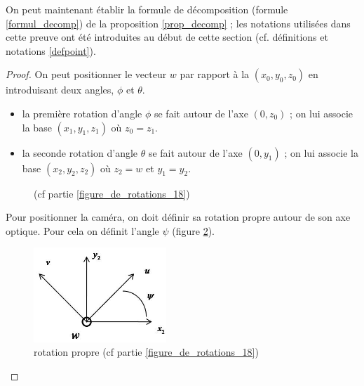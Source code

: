 On peut maintenant établir la formule de décomposition (formule \ref{formul_decomp}) de la proposition \ref{prop_decomp} ; les notations utilisées dans cette preuve ont été introduites au début de cette section (cf. définitions et notations \ref{defpoint}).

\begin{proof}
On peut positionner le vecteur $w$ par rapport à la $(x_{0},y_{0},z_{0}) $ en introduisant deux angles, $\phi$ et $\theta$.

\begin{itemize}
\item la première rotation d'angle $\phi$ se fait autour de l'axe $(0,z_{0})$ ; on lui associe la base $(x_{1},y_{1},z_{1})$ où $z_{0}=z_{1}$.
\item la seconde rotation d'angle $\theta$ se fait autour de l'axe $(0,y_1)$ ; on lui associe la base $(x_{2},y_{2},z_{2})$ où $z_{2}=w$ et $y_{1}=y_{2}$.
\end{itemize}

\begin{figure}[h!]
\centering
{}
\caption{(cf partie \ref{figure_de_rotations_18})}
\label{img_angles}
\end{figure}

Pour positionner la caméra, on doit définir sa rotation propre autour de son axe optique. Pour cela on définit l'angle $\psi$ (figure \ref{decompgeo_rotationPropre}).
\begin{figure}[h!]
\centering
\includegraphics[width=5cm]{graphe3.jpg}
\caption{rotation propre (cf partie \ref{figure_de_rotations_18})}
\label{decompgeo_rotationPropre}
\end{figure}


\end{proof}

